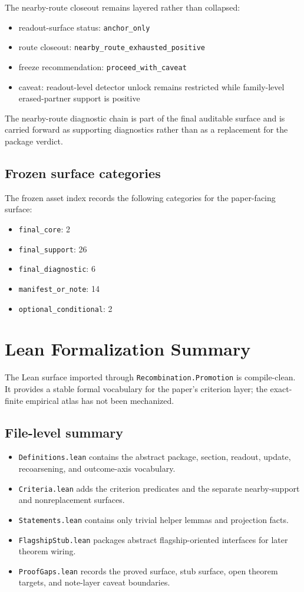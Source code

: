 \documentclass[11pt]{article}
\theoremstyle{definition}
\begin{document}
The nearby-route closeout remains layered rather than collapsed:
\begin{itemize}
\item readout-surface status: \texttt{anchor\_only}
\item route closeout: \texttt{nearby\_route\_exhausted\_positive}
\item freeze recommendation: \texttt{proceed\_with\_caveat}
\item caveat: readout-level detector unlock remains restricted while family-level erased-partner support is positive
\end{itemize}

The nearby-route diagnostic chain is part of the final auditable surface and is carried forward as supporting diagnostics rather than as a replacement for the package verdict.

\subsection*{Frozen surface categories}

The frozen asset index records the following categories for the paper-facing surface:
\begin{itemize}
\item \texttt{final\_core}: 2
\item \texttt{final\_support}: 26
\item \texttt{final\_diagnostic}: 6
\item \texttt{manifest\_or\_note}: 14
\item \texttt{optional\_conditional}: 2
\end{itemize}
 \section{Lean Formalization Summary}
\label{app:lean-summary}

The Lean surface imported through \texttt{Recombination.Promotion} is compile-clean. It provides a stable formal vocabulary for the paper's criterion layer; the exact-finite empirical atlas has not been mechanized.

\subsection*{File-level summary}

\begin{itemize}
\item \texttt{Definitions.lean} contains the abstract package, section, readout, update, recoarsening, and outcome-axis vocabulary.
\item \texttt{Criteria.lean} adds the criterion predicates and the separate nearby-support and nonreplacement surfaces.
\item \texttt{Statements.lean} contains only trivial helper lemmas and projection facts.
\item \texttt{FlagshipStub.lean} packages abstract flagship-oriented interfaces for later theorem wiring.
\item \texttt{ProofGaps.lean} records the proved surface, stub surface, open theorem targets, and note-layer caveat boundaries.
\end{itemize}
\end{document}
